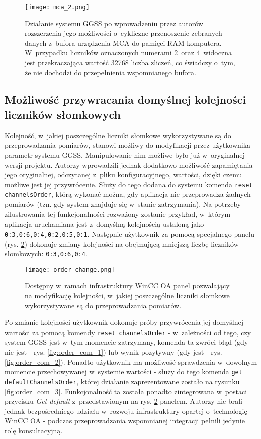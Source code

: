 \begin{figure}[H]
\centering
\texttt{[image: mca\_2.png]}
\caption{Działanie systemu GGSS po wprowadzeniu przez autorów rozszerzenia jego możliwości o~cykliczne przenoszenie zebranych danych z~bufora urządzenia MCA do pamięci RAM komputera. W~przypadku liczników oznaczonych numerami 2~oraz 4~widoczna jest przekraczająca wartość 32768 liczba zliczeń, co świadczy o~tym, że nie dochodzi do przepełnienia wspomnianego bufora.}
\label{fig:mca_2}
\end{figure}

\subsection{Możliwość przywracania domyślnej kolejności liczników słomkowych}

Kolejność, w~jakiej poszczególne liczniki słomkowe wykorzystywane są do przeprowadzania pomiarów, stanowi możliwy do modyfikacji przez użytkownika parametr systemu GGSS. Manipulowanie nim możliwe było już w~oryginalnej wersji projektu. Autorzy wprowadzili jednak dodatkowo możliwość zapamiętania jego oryginalnej, odczytanej z~pliku konfiguracyjnego, wartości, dzięki czemu możliwe jest jej przywrócenie. Służy do tego dodana do systemu komenda \lstinline{reset channelsOrder}, którą wykonać można, gdy aplikacja nie przeprowadza żadnych pomiarów (tzn. gdy system znajduje się w~stanie zatrzymania). Na potrzeby zilustrowania tej funkcjonalności rozważony zostanie przykład, w~którym aplikacja uruchamiana jest z~domyślną kolejnością ustaloną jako \lstinline{0:3,0:6,0:4,0:2,0:5,0:1}. Następnie użytkownik za pomocą specjalnego panelu (rys. \ref{fig:order_change}) dokonuje zmiany kolejności na obejmującą mniejszą liczbę liczników słomkowych: \lstinline{0:3,0:6,0:4}.


\begin{figure}[H]
\centering
\texttt{[image: order\_change.png]}
\caption{Dostępny w~ramach infrastruktury WinCC OA panel pozwalający na modyfikację kolejności, w~jakiej poszczególne liczniki słomkowe wykorzystywane są do przeprowadzania pomiarów.}
\label{fig:order_change}
\end{figure}


Po zmianie kolejności użytkownik dokonuje próby przywrócenia jej domyślnej wartości za pomocą komendy \lstinline{reset channelsOrder} - w~zależności od tego, czy system GGSS jest w~tym momencie zatrzymany, komenda ta zwróci błąd (gdy nie jest - rys. \ref{fig:order_com_1}) lub wynik pozytywny (gdy jest - rys. \ref{fig:order_com_2}). Ponadto użytkownik ma możliwość sprawdzenia w~dowolnym momencie przechowywanej w~systemie wartości - służy do tego komenda \lstinline{get defaultChannelsOrder}, której działanie zaprezentowane zostało na rysunku \ref{fig:order_com_3}. Funkcjonalność ta została ponadto zintegrowana w~postaci przycisku \emph{Get default} z~przedstawionym na rys. \ref{fig:order_change} panelem. Autorzy nie brali jednak bezpośredniego udziału w~rozwoju infrastruktury opartej o~technologię WinCC OA - podczas przeprowadzania wspomnianej integracji pełnili jedynie rolę konsultacyjną.

